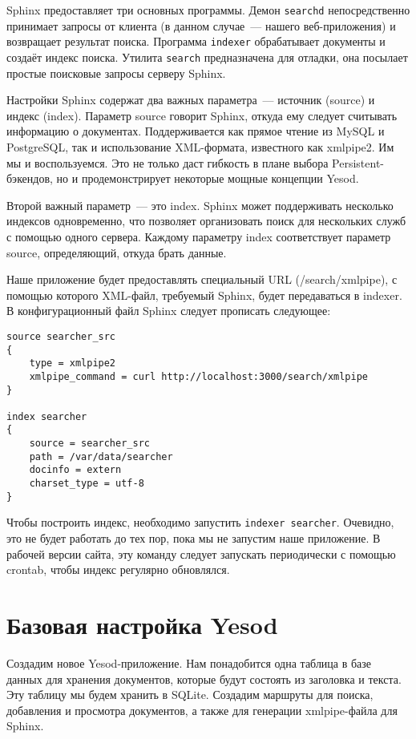 Sphinx предоставляет три основных программы. Демон \lstinline!searchd! непосредственно принимает запросы от клиента (в данном случае~--- нашего веб-приложения) и возвращает результат поиска. Программа \lstinline!indexer! обрабатывает документы и создаёт индекс поиска. Утилита \lstinline!search! предназначена для отладки, она посылает простые поисковые запросы серверу Sphinx.

Настройки Sphinx содержат два важных параметра~--- источник (source) и индекс (index). Параметр source говорит Sphinx, откуда ему следует считывать информацию о документах. Поддерживается как прямое чтение из MySQL и PostgreSQL, так и использование XML-формата, известного как xmlpipe2. Им мы и воспользуемся. Это не только даст гибкость в плане выбора Persistent-бэкендов, но и продемонстрирует некоторые мощные концепции Yesod.

Второй важный параметр~--- это index. Sphinx может поддерживать несколько индексов одновременно, что позволяет организовать поиск для нескольких служб с помощью одного сервера. Каждому параметру index соответствует параметр source, определяющий, откуда брать данные.

Наше приложение будет предоставлять специальный URL (/search/xmlpipe), с помощью которого XML-файл, требуемый Sphinx, будет передаваться в indexer. В конфигурационный файл Sphinx следует прописать следующее:

\begin{lstlisting}
source searcher_src
{
    type = xmlpipe2
    xmlpipe_command = curl http://localhost:3000/search/xmlpipe
}

index searcher
{
    source = searcher_src
    path = /var/data/searcher
    docinfo = extern
    charset_type = utf-8
}
\end{lstlisting}

Чтобы построить индекс, необходимо запустить \lstinline!indexer searcher!. Очевидно, это не будет работать до тех пор, пока мы не запустим наше приложение.  В рабочей версии сайта, эту команду следует запускать периодически с помощью crontab, чтобы индекс регулярно обновлялся.

\section{Базовая настройка Yesod} %

Создадим новое Yesod-приложение. Нам понадобится одна таблица в базе данных для хранения документов, которые будут состоять из заголовка и текста. Эту таблицу мы будем хранить в SQLite. Создадим маршруты для поиска, добавления и просмотра документов, а также для генерации xmlpipe-файла для Sphinx.

